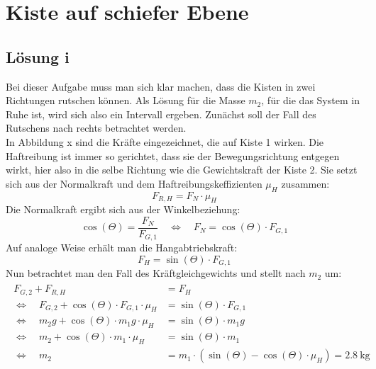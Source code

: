 \section{Kiste auf schiefer Ebene}
\subsection{Lösung i}
  Bei dieser Aufgabe muss man sich klar machen, dass die Kisten in zwei Richtungen rutschen können. Als Lösung
  für die Masse $m_2$, für die das System in Ruhe ist, wird sich also ein Intervall ergeben.
  Zunächst soll der Fall des Rutschens nach rechts betrachtet werden. \\
  In Abbildung x sind die Kräfte eingezeichnet, die auf Kiste 1 wirken. Die Haftreibung ist immer so gerichtet, dass
  sie der Bewegungsrichtung entgegen wirkt, hier also in die selbe Richtung wie die Gewichtskraft der Kiste 2. Sie setzt
  sich aus der Normalkraft und dem Haftreibungskeffizienten $\mu_H$ zusammen:
  \begin{equation}
    F_{R,H} = F_N \cdot \mu_H
  \end{equation}
  Die Normalkraft ergibt sich aus der Winkelbeziehung:
  \begin{equation}
    \cos\left(\Theta\right) = \frac{F_N}{F_{G,1}}\quad \Leftrightarrow\quad F_N = \cos\left(\Theta\right) \cdot F_{G,1}
  \end{equation}
  Auf analoge Weise erhält man die Hangabtriebskraft:
  \begin{equation}
     F_H = \sin\left(\Theta\right) \cdot F_{G,1}
  \end{equation}
  Nun betrachtet man den Fall des Kräftgleichgewichts und stellt nach $m_2$ um:
  \begin{align}
    \begin{aligned}
      F_{G,2} + F_{R,H} &= F_H\\
    \Leftrightarrow \quad  F_{G,2} + \cos\left(\Theta\right) \cdot F_{G,1} \cdot \mu_H &= \sin\left(\Theta\right) \cdot F_{G,1} \\
    \Leftrightarrow \quad m_2 g + \cos\left(\Theta\right) \cdot m_1 g \cdot \mu_H &= \sin\left(\Theta\right) \cdot m_1 g \\
    \Leftrightarrow \quad m_2  + \cos\left(\Theta\right) \cdot m_1  \cdot \mu_H &= \sin\left(\Theta\right) \cdot m_1  \\
    \Leftrightarrow \quad m_2 &= m_1 \cdot (\sin\left(\Theta\right) - \cos\left(\Theta\right)  \cdot \mu_H) = \SI{2.8}{\kilo\gram}
  \end{aligned}
  \label{eq: m_2}
  \end{align}
